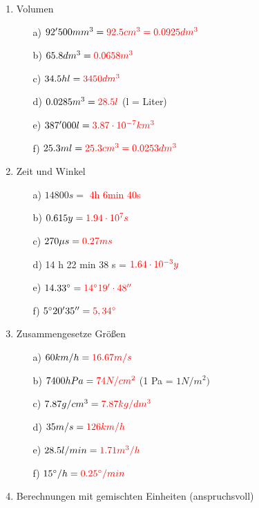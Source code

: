 \documentclass[11pt, a4paper, twoside, fleqn]{article}
\begin{document}
\begin{enumerate}[itemsep=1ex, leftmargin=*]
\item Volumen 
    \begin{enumerate}[itemsep=2mm]
        \item[a)] $ 92'500 mm^{3} = \textcolor{red}{92.5 cm^{3} = 0.0925 dm^{3}} $
        \item[b)] $ 65.8 dm^{3} = \textcolor{red}{0.0658 m^{3}} $
        \item[c)] $ 34.5 hl = \textcolor{red}{3450 dm^{3}} $
        \item[d)] $ 0.0285 m^{3} = \textcolor{red}{28.5 l} $ (l = Liter)
        \item[e)] $ 387'000 l = \textcolor{red}{3.87 \cdot 10^{-7} km^{3}} $
        \item[f)] $ 25.3 ml = \textcolor{red}{25.3 cm^{3} = 0.0253 dm^{3}} $
    \end{enumerate}
\newpage
\item Zeit und Winkel
 \begin{enumerate}[itemsep=2mm]
     \item[a)] $ 14800 s = $ \textcolor{red}{4h 6min 40s}
     \item[b)] $ 0.615 y = \textcolor{red}{1.94 \cdot10^{7} s} $
     \item[c)] $ 270 \mu s =  \textcolor{red}{0.27 ms} $
     \item[d)] 14 h 22 min 38 s = $\textcolor{red}{1.64 \cdot 10^{-3} y} $
     \item[e)] $ 14.33 ^{\circ} = \textcolor{red}{14 ^{\circ} 19' \cdot 48''}$ 
    \item[f)] $ 5 ^{\circ} 20' 35'' = \textcolor{red}{5,34 ^{\circ}} $
 \end{enumerate}
 \item Zusammengesetze Größen
    \begin{enumerate}[itemsep=2mm]
        \item [a)] $ 60 km/h = \textcolor{red}{16.67 m/s} $
        \item[b)] $ 7400 hPa = \textcolor{red}{74 N/cm^{2}} $ (1 Pa = $1 N/m^{2}) $ 
        \item[c)] $ 7.87 g/cm^{3} = \textcolor{red}{7.87 kg/dm^{3}} $
        \item[d)] $ 35 m/s = \textcolor{red}{126 km/h} $
        \item[e)] $ 28.5 l/min = \textcolor{red}{1.71 m^{3} / h} $
        \item[f)] $ 15 ^{\circ} /h = \textcolor{red}{0.25 ^{\circ} / min} $
    \end{enumerate}
\item Berechnungen mit gemischten Einheiten (anspruchsvoll)

\end{enumerate}
\end{document}

